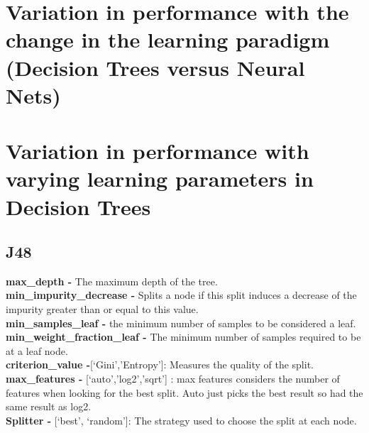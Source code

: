 \documentclass[11pt]{article}
\begin{document}
\newpage
\section{Variation in performance with the change in the learning paradigm (Decision Trees versus
Neural Nets)}

\newpage
\section{Variation in performance with varying learning parameters in Decision Trees}
\subsection{J48}

\textbf{max\_depth -} The maximum depth of the tree. \\
\textbf{min\_impurity\_decrease -} Splits a node if this split induces a decrease of the impurity greater than or equal to this value. \\
\textbf{min\_samples\_leaf -} the minimum number of samples to be considered a leaf. \\
\textbf{min\_weight\_fraction\_leaf -} The minimum number of samples required to be at a leaf node. \\
\textbf{criterion\_value -}[‘Gini’,’Entropy’]: Measures the quality of the split.
\textbf{max\_features -} [‘auto’,’log2’,’sqrt’] : max features considers the number of features when looking for the best split. Auto just picks the best result so had the same result as log2. \\
\textbf{Splitter -} [‘best’, ‘random’]: The strategy used to choose the split at each node. \\
\end{document}
